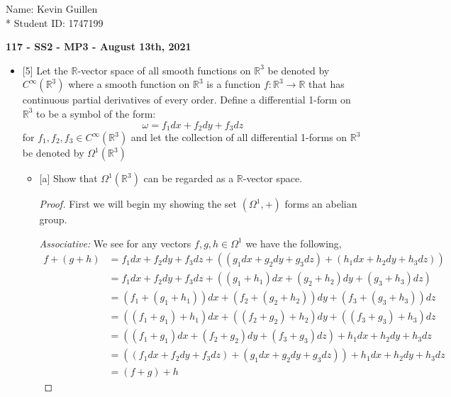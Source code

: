 \documentclass[12pt]{article}
\newcommand      {\Rm}         {{\mathbb R}}
\newcommand {\f}[1]{{#1_1 dx + #1_2 dy + #1_3 dz}}
\newcommand {\ff}[2]{{(#1_1 + #2_1) dx + (#1_2+ #2_2) dy + (#1_3 +#2_3)dz}}
\begin{document}
\begin{flushright}
    Name: Kevin Guillen \\*
    Student ID: 1747199
\end{flushright}
\begin{center}
    {\bf 117 - SS2 - MP3 - August 13th, 2021}
\end{center}
\begin{itemize}
    \item{[5]} Let the $\Rm$-vector space of all smooth functions on $\Rm^3$ be denoted by $C^\infty(\Rm^3)$ where a smooth function on $\Rm^3$ is a
    function $f : \Rm^3 \rightarrow \Rm$ that has continuous partial derivatives of every order. Define a differential 1-form on $\Rm^3$ to be
    a symbol of the form: \[\omega = f_1dx + f_2dy + f_3dz\]
    for $f_1,f_2,f_3\in C^\infty(\Rm^3)$ and let the collection of all differential 1-forms on $\Rm^3$ be denoted by $\Omega^1(\Rm^3)$
    \begin{itemize}
        \item{[a]} Show that $\Omega^1(\Rm^3)$ can be regarded as a $\Rm$-vector space.
        \begin{proof}
                First we will begin my showing the set $(\Omega^1,+)$ forms an abelian group.
                
                \textit{Associative:} We see for any vectors $f,g,h \in \Omega^1$ we have the following,
                \begin{align*}
                    f+(g+h) &= \f{f} + ((\f{g}) + (\f{h})) \\
                     &=\f{f} + (\ff{g}{h}) \\
                     &= (f_1 + (g_1 + h_1))dx+ (f_2 + (g_2 + h_2))dy +(f_3 + (g_3 + h_3))dz \\
                     &= ((f_1 + g_1) + h_1)dx+ ((f_2 + g_2) + h_2)dy +((f_3 + g_3) + h_3)dz \\
                     &=(\ff{f}{g}) + \f{h} \\
                     &= ((\f{f}) + (\f{g})) + \f{h} \\
                     &= (f+g) + h
                \end{align*}


\end{proof}
\end{itemize}
\end{itemize}
\end{document}
